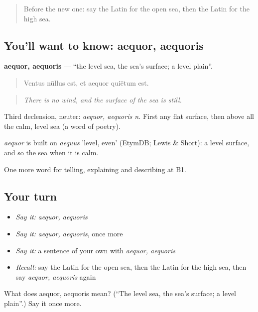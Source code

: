 \begin{quote}
Before the new one: say the Latin for the open sea, then the Latin for the high sea.
\end{quote}

\subsection*{You'll want to know: aequor, aequoris}
\textbf{aequor, aequoris} — \textquotedblleft{}the level sea, the sea's surface; a level plain\textquotedblright{}.

\begin{quote}
Ventus nūllus est, et aequor quiētum est.
\end{quote}

\begin{quote}
\emph{There is no wind, and the surface of the sea is still.}
\end{quote}

Third declension, neuter: \emph{aequor, aequoris n.} First any flat surface, then above all the calm, level sea (a word of poetry).

\begin{cousinweb}
\emph{aequor} is built on \emph{aequus} 'level, even' (EtymDB; Lewis \& Short): a level surface, and so the sea when it is calm.
\end{cousinweb}

\begin{grammarlens}[title={What you've built}]
One more word for telling, explaining and describing at B1.
\end{grammarlens}

\subsection*{Your turn}
\begin{itemize}
\raggedright
  \item \emph{Say it:} \emph{aequor, aequoris}
  \item \emph{Say it:} \emph{aequor, aequoris}, once more
  \item \emph{Say it:} a sentence of your own with \emph{aequor, aequoris}
  \item \emph{Recall:} say the Latin for the open sea, then the Latin for the high sea, then say \emph{aequor, aequoris} again
\end{itemize}

\begin{tcolorbox}[breakable,colback=teal!4,colframe=teal!35!black,title={Before you move on}]
What does aequor, aequoris mean? (\textquotedblleft{}The level sea, the sea's surface; a level plain\textquotedblright{}.) Say it once more.
\end{tcolorbox}
